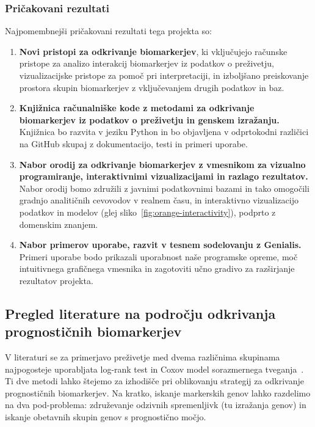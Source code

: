 \documentclass[11pt,a4paper]{article}
\renewcommand{\bold}{\textbf}
\begin{document}
\subsubsection*{Pričakovani rezultati}
Najpomembnejši pričakovani rezultati tega projekta so:
\begin{enumerate}
	\item \bold{Novi pristopi za odkrivanje biomarkerjev}, ki vključujejo računske pristope za analizo interakcij biomarkerjev iz podatkov o preživetju, vizualizacijske pristope za pomoč pri interpretaciji, in izboljšano preiskovanje prostora skupin biomarkerjev z vključevanjem drugih podatkov in baz.
	\item \bold{Knjižnica računalniške kode z metodami za odkrivanje biomarkerjev iz podatkov o preživetju in genskem izražanju.} Knjižnica bo razvita v jeziku Python in bo objavljena v odprtokodni različici na GitHub skupaj z dokumentacijo, testi in primeri uporabe.
	\item \bold{Nabor orodij za odkrivanje biomarkerjev z vmesnikom za vizualno programiranje, interaktivnimi vizualizacijami in razlago rezultatov.} Nabor orodij bomo združili z javnimi podatkovnimi bazami in tako omogočili gradnjo analitičnih cevovodov v realnem času, in interaktivno vizualizacijo podatkov in modelov (glej sliko~\ref{fig:orange-interactivity}), podprto z domenskim znanjem.
	\item \bold{Nabor primerov uporabe, razvit v tesnem sodelovanju z Genialis.} Primeri uporabe bodo prikazali uporabnost naše programske opreme, moč intuitivnega grafičnega vmesnika in zagotoviti učno gradivo za razširjanje rezultatov projekta.
\end{enumerate}



\subsection{Pregled literature na področju odkrivanja prognostičnih biomarkerjev}

V literaturi se za primerjavo preživetje med dvema različnima skupinama najpogosteje uporabljata log-rank test in Coxov model sorazmernega tveganja~\cite{singh2011survival}. Ti dve metodi lahko štejemo za izhodišče pri oblikovanju strategij za odkrivanje prognostičnih biomarkerjev. Na kratko, iskanje markerskih genov lahko razdelimo na dva pod-problema: združevanje odzivnih spremenljivk (tu izražanja genov) in iskanje obetavnih skupin genov s prognostično močjo.
\end{document}

